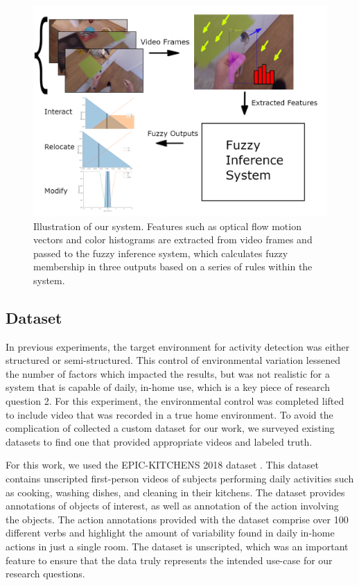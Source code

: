 \documentclass[12pt]{report}
\begin{document}
\begin{figure}[t]
\centerline{\includegraphics[width=.9\linewidth]{figure/diagram.png}}
\caption{Illustration of our system. Features such as optical flow motion vectors and color histograms are extracted from video frames and passed to the fuzzy inference system, which calculates fuzzy membership in three outputs based on a series of rules within the system.}
\label{diagram}
\end{figure}

\subsection{Dataset}
In previous experiments, the target environment for activity detection was either structured or semi-structured. This control of environmental variation lessened the number of factors which impacted the results, but was not realistic for a system that is capable of daily, in-home use, which is a key piece of research question 2. For this experiment, the environmental control was completed lifted to include video that was recorded in a true home environment. To avoid the complication of collected a custom dataset for our work, we surveyed existing datasets to find one that provided appropriate videos and labeled truth.

For this work, we used the EPIC-KITCHENS 2018 dataset \cite{Damen2018ScalingDataset}. This dataset contains unscripted first-person videos of subjects performing daily activities such as cooking, washing dishes, and cleaning in their kitchens. The dataset provides annotations of objects of interest, as well as annotation of the action involving the objects. The action annotations provided with the dataset comprise over 100 different verbs and highlight the amount of variability found in daily in-home actions in just a single room. The dataset is unscripted, which was an important feature to ensure that the data truly represents the intended use-case for our research questions.
\end{document}
